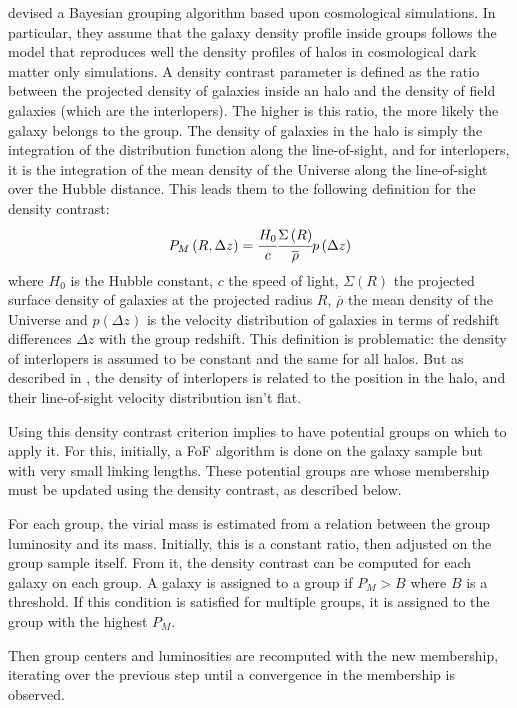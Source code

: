 \cite{Yang+05, Yang+07} devised a Bayesian grouping algorithm based upon
cosmological simulations. In particular, they assume that the galaxy density
profile inside groups follows the \citet{NFW+97} model that reproduces well the
density profiles of halos in cosmological dark matter only simulations. A
density contrast parameter is defined as the ratio between the projected
density of galaxies inside an halo and the density of field galaxies (which are
the interlopers). The higher is this ratio, the more likely the galaxy belongs
to the group. The density of galaxies in the halo is simply the integration of
the distribution function along the line-of-sight, and for interlopers, it is
the integration of the mean density of the Universe along the line-of-sight
over the Hubble distance. This leads them to the following definition for the
density contrast:
%
\begin{equation}
    P_M \left(R, \Delta z\right)=\cfrac{H_0}{c} \cfrac{\Sigma
    \left(R\right)}{\overline{\rho}} p \left(\Delta z\right)
\end{equation}
%
where $H_0$ is the Hubble constant, $c$ the speed of light,
$\Sigma\left(R\right)$ the projected surface density of galaxies at the
projected radius $R$, $\overline{\rho}$ the mean density of the Universe and $p
\left(\Delta z\right)$ is the velocity distribution of galaxies in terms of
redshift differences $\Delta z$ with the group redshift. This definition is
problematic: the density of interlopers is assumed to be constant and the same
for all halos. But as described in \citet{MBM+10}, the density of interlopers
is related to the position in the halo, and their line-of-sight velocity
distribution isn't flat.

Using this density contrast criterion implies to have potential groups on which
to apply it. For this, initially, a FoF algorithm is done on the galaxy sample
but with very small linking lengths. These potential groups are whose
membership must be updated using the density contrast, as described below.

For each group, the virial mass is estimated from a relation between the group
luminosity and its mass. Initially, this is a constant ratio, then adjusted on
the group sample itself. From it, the density contrast can be computed for each
galaxy on each group. A galaxy is assigned to a group if $P_M>B$ where $B$ is a
threshold. If this condition is satisfied for multiple groups, it is assigned
to the group with the highest $P_M$.

Then group centers and luminosities are recomputed with the new membership,
iterating over the previous step until a convergence in the membership is
observed.

